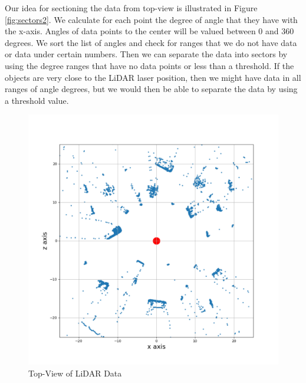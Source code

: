 Our idea for sectioning the data from top-view is illustrated in
Figure \ref{fig:sectors2}. We calculate for each point the degree of angle that they have with the x-axis.
Angles of data points to the center will be valued between 0 and 360 degrees. We sort the list of angles
and check for ranges that we do not have data or data under certain numbers. Then we can separate the data into sectors by using the degree ranges that have no data points or less than a threshold. If the objects are very close to the LiDAR laser position, then we might have data in all ranges of angle degrees, but we would then be able
to separate the data by using a threshold value.
\begin{figure}[!h]
\centering
\begin{minipage}{0.40\textwidth}
  \centering
         \includegraphics[scale=0.3]{./images/sector-transforms/scene-with-centre.pdf}
       \caption{Top-View of LiDAR Data}
       \label{fig:sectors1}
\end{minipage}%
\begin{minipage}{0.40\textwidth}
  \centering

\end{minipage}
\end{figure}
